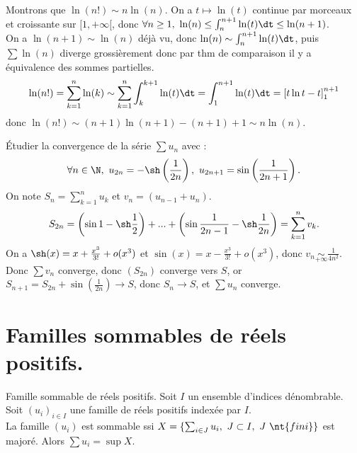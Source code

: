 \documentclass[11pt]{article}
\begin{document}
\begin{ex}{}{}
    Montrons que $\ln(n!)\sim n\ln(n)$.
    \tcblower
    On a $t\mapsto\ln(t)$ continue par morceaux et croissante sur $[1,+\infty[$, donc $\forall n \geq 1, ~ \ln(n) \leq \int_n^{n+1}\ln(t)\dt\leq\ln(n+1)$.\\
    On a $\ln(n+1)\sim\ln(n)$ déjà vu, donc $\ln(n)\sim\int_n^{n+1}\ln(t)\dt$, puis $\sum \ln(n)$ diverge grossièrement donc par thm de comparaison il y a équivalence des sommes partielles.
    \begin{equation*}
        \ln(n!) = \sum_{k=1}^n\ln(k)\sim\sum_{k=1}^n\int_k^{k+1}\ln(t)\dt=\int_1^{n+1}\ln(t)\dt=\left[ t\ln t - t \right]_1^{n+1}
    \end{equation*} 
    donc $\ln(n!)\sim(n+1)\ln(n+1)-(n+1)+1\sim n\ln(n)$.
\end{ex}

\begin{ex}{}{}
    Étudier la convergence de la série $\sum u_n$ avec :
    \begin{equation*}
        \forall n \in \N, ~ u_{2n}=-\sh\left( \frac{1}{2n} \right), ~ u_{2n+1}=\sin\left( \frac{1}{2n+1} \right).
    \end{equation*}
    \tcblower
    On note $S_n=\sum_{k=1}^nu_k$ et $v_n = (u_{n-1} + u_n)$.
    \begin{equation*}
        S_{2n}=\left( \sin 1 - \sh \frac{1}{2} \right) + ... + \left( \sin\frac{1}{2n-1} - \sh\frac{1}{2n} \right) = \sum_{k=1}^nv_k.
    \end{equation*}
    On a $\sh(x)= x + \frac{x^3}{3!} + o(x^3)$ et $\sin(x)= x - \frac{x^3}{3!} + o(x^3)$, donc $v_n\underset{+\infty}{\sim}\frac{1}{4n^2}$.\\
    Donc $\sum v_n$ converge, donc $(S_{2n})$ converge vers $S$, or $S_{n+1}=S_{2n} + \sin\left(\frac{1}{2n}\right)\to S$, donc $S_n\to S$, et $\sum u_n$ converge.
\end{ex}

\section{Familles sommables de réels positifs.}

\begin{defi}{Famille sommable de réels positifs.}{}
    Soit $I$ un ensemble d'indices dénombrable. Soit $(u_i)_{i\in I}$ une famille de réels positifs indexée par $I$.\\
    La famille $(u_i)$ est sommable ssi $X=\{\sum_{i\in J}u_i, ~ J\subset I, ~ J ~ \nt{fini}\}$ est majoré. Alors $\sum u_i = \sup X$.
\end{defi}
\end{document}
